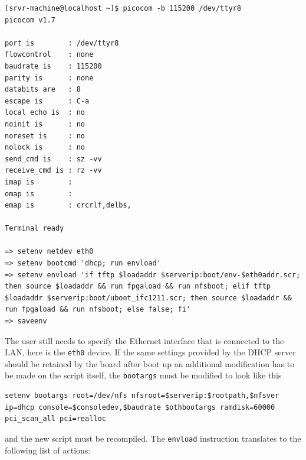 \documentclass[11pt
  , a4paper
  , article
  , oneside
  , showtrims
]{memoir}
\begin{document}
\begin{lstlisting}[style=termstyle]
[srvr-machine@localhost ~]$ picocom -b 115200 /dev/ttyr8
picocom v1.7

port is        : /dev/ttyr8
flowcontrol    : none
baudrate is    : 115200
parity is      : none
databits are   : 8
escape is      : C-a
local echo is  : no
noinit is      : no
noreset is     : no
nolock is      : no
send_cmd is    : sz -vv
receive_cmd is : rz -vv
imap is        : 
omap is        : 
emap is        : crcrlf,delbs,

Terminal ready

=> setenv netdev eth0
=> setenv bootcmd 'dhcp; run envload'
=> setenv envload 'if tftp $loadaddr $serverip:boot/env-$eth0addr.scr; then source $loadaddr && run fpgaload && run nfsboot; elif tftp $loadaddr $serverip:boot/uboot_ifc1211.scr; then source $loadaddr && run fpgaload && run nfsboot; else false; fi'
=> saveenv
\end{lstlisting}

The user still needs to specify the Ethernet interface that is connected to the LAN, here is the \texttt{eth0} device.
If the same settings provided by the DHCP server should be retained by the board after boot up an additional modification has to be made on the script itself, the \texttt{bootargs} must be modified to look like this
\begin{lstlisting}[style=texteditor]
setenv bootargs root=/dev/nfs nfsroot=$serverip:$rootpath,$nfsver ip=dhcp console=$consoledev,$baudrate $othbootargs ramdisk=60000 pci_scan_all pci=realloc
\end{lstlisting}
and the new script must be recompiled.
\newline
\newline
\newline
The \texttt{envload} instruction translates to the following list of actions:
\end{document}
